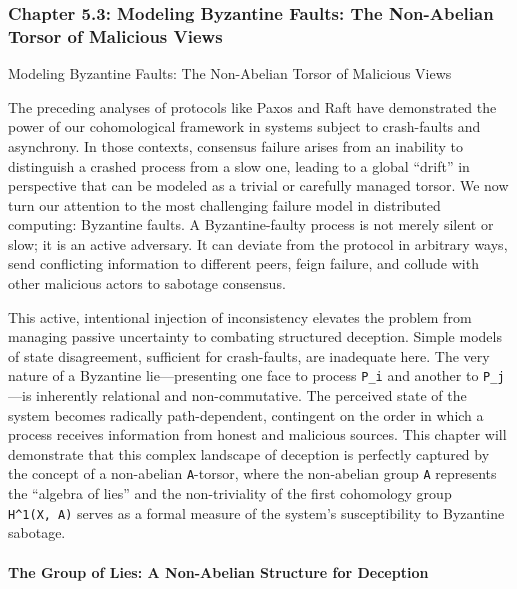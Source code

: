 \documentclass[
]{article}
\begin{document}
\subsubsection{Chapter 5.3: Modeling Byzantine Faults: The Non-Abelian
Torsor of Malicious
Views}\label{chapter-5.3-modeling-byzantine-faults-the-non-abelian-torsor-of-malicious-views}

\protect{}\label{chapter-5-3-Modeling_Byzantine_Faults__The_Non-Abeli}{}

Modeling Byzantine Faults: The Non-Abelian Torsor of Malicious Views

The preceding analyses of protocols like Paxos and Raft have
demonstrated the power of our cohomological framework in systems subject
to crash-faults and asynchrony. In those contexts, consensus failure
arises from an inability to distinguish a crashed process from a slow
one, leading to a global ``drift'' in perspective that can be modeled as
a trivial or carefully managed torsor. We now turn our attention to the
most challenging failure model in distributed computing: Byzantine
faults. A Byzantine-faulty process is not merely silent or slow; it is
an active adversary. It can deviate from the protocol in arbitrary ways,
send conflicting information to different peers, feign failure, and
collude with other malicious actors to sabotage consensus.

This active, intentional injection of inconsistency elevates the problem
from managing passive uncertainty to combating structured deception.
Simple models of state disagreement, sufficient for crash-faults, are
inadequate here. The very nature of a Byzantine lie---presenting one
face to process \texttt{P\_i} and another to \texttt{P\_j}---is
inherently relational and non-commutative. The perceived state of the
system becomes radically path-dependent, contingent on the order in
which a process receives information from honest and malicious sources.
This chapter will demonstrate that this complex landscape of deception
is perfectly captured by the concept of a non-abelian \texttt{A}-torsor,
where the non-abelian group \texttt{A} represents the ``algebra of
lies'' and the non-triviality of the first cohomology group
\texttt{H\^{}1(X,\ A)} serves as a formal measure of the system's
susceptibility to Byzantine sabotage.

\paragraph{The Group of Lies: A Non-Abelian Structure for
Deception}\label{the-group-of-lies-a-non-abelian-structure-for-deception}
\end{document}
